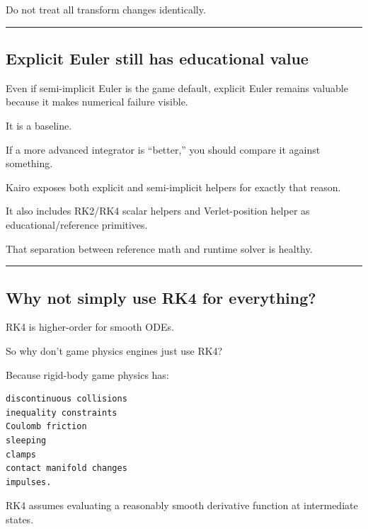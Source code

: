 Do not treat all transform changes identically.

\begin{center}\rule{0.5\linewidth}{0.5pt}\end{center}

\subsection{Explicit Euler still has educational value}\label{06-engine-ii-ch038-explicit-euler-still-has-educational-value}

\hypertarget{06-engine-ii-ch038-explicit-euler-still-has-educational-value}{}

Even if semi-implicit Euler is the game default, explicit Euler remains valuable because it makes numerical failure visible.

It is a baseline.

If a more advanced integrator is ``better,'' you should compare it against something.

Kairo exposes both explicit and semi-implicit helpers for exactly that reason.

It also includes RK2/RK4 scalar helpers and Verlet-position helper as educational/reference primitives.

That separation between reference math and runtime solver is healthy.

\begin{center}\rule{0.5\linewidth}{0.5pt}\end{center}

\subsection{Why not simply use RK4 for everything?}\label{06-engine-ii-ch038-why-not-simply-use-rk4-for-everything}

\hypertarget{06-engine-ii-ch038-why-not-simply-use-rk4-for-everything}{}

RK4 is higher-order for smooth ODEs.

So why don't game physics engines just use RK4?

Because rigid-body game physics has:

\begin{verbatim}
discontinuous collisions
inequality constraints
Coulomb friction
sleeping
clamps
contact manifold changes
impulses.
\end{verbatim}

RK4 assumes evaluating a reasonably smooth derivative function at intermediate states.

